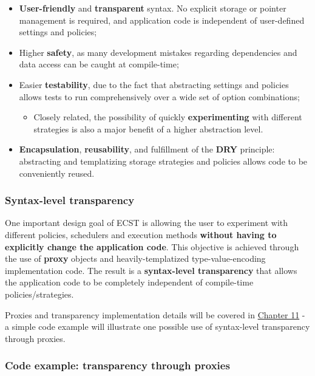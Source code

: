 \documentclass[twoside, 12pt, a4paper, openany]{book}
\providecommand{\tightlist}{%
  \setlength{\itemsep}{0pt}\setlength{\parskip}{0pt}}
\begin{document}
\begin{itemize}
\item
  \textbf{User-friendly} and \textbf{transparent} syntax. No explicit
  storage or pointer management is required, and application code is
  independent of user-defined settings and policies;
\item
  Higher \textbf{safety}, as many development mistakes regarding
  dependencies and data access can be caught at compile-time;
\item
  Easier \textbf{testability}, due to the fact that abstracting settings
  and policies allows tests to run comprehensively over a wide set of
  option combinations;

  \begin{itemize}
  \tightlist
  \item
    Closely related, the possibility of quickly \textbf{experimenting}
    with different strategies is also a major benefit of a higher
    abstraction level.
  \end{itemize}
\item
  \textbf{Encapsulation}, \textbf{reusability}, and fulfillment of the
  \textbf{DRY} principle: abstracting and templatizing storage
  strategies and policies allows code to be conveniently reused.
\end{itemize}

\hypertarget{ecstoverview_syntaxtransp}{\subsubsection{Syntax-level
transparency}\label{ecstoverview_syntaxtransp}}

One important design goal of ECST is allowing the user to experiment
with different policies, schedulers and execution methods
\textbf{without having to explicitly change the application code}. This
objective is achieved through the use of \textbf{proxy} objects and
heavily-templatized type-value-encoding implementation code. The result
is a \textbf{syntax-level transparency} that allows the application code
to be completely independent of compile-time policies/strategies.

Proxies and transparency implementation details will be covered in
\protect\hyperlink{chap_proxies}{Chapter 11} - a simple code example
will illustrate one possible use of syntax-level transparency through
proxies.

\subsubsection{Code example: transparency through
proxies}\label{code-example-transparency-through-proxies}
\end{document}
